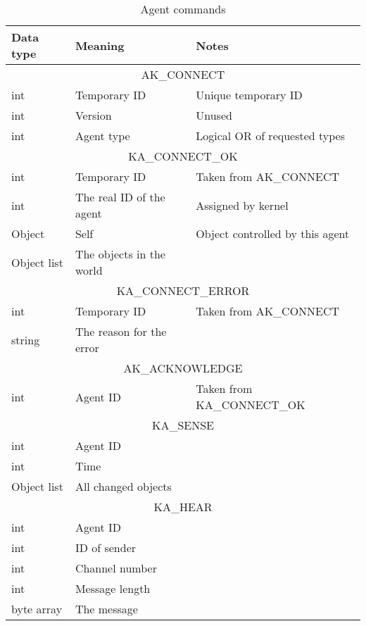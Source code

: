 \begin{table}[p]
\center
\begin{tabular}{|lll|}
\hline
Data type & Meaning & Notes\\
\hline
\hline
\multicolumn{3}{|c|}{AK\_CONNECT}\\
int & Temporary ID & Unique temporary ID\\
int & Version & Unused\\
int & Agent type & Logical OR of requested types\\
\hline
\hline
\multicolumn{3}{|c|}{KA\_CONNECT\_OK}\\
int & Temporary ID & Taken from AK\_CONNECT\\
int & The real ID of the agent & Assigned by kernel\\
Object & Self & Object controlled by this agent\\
Object list & The objects in the world & \\
\hline
\hline
\multicolumn{3}{|c|}{KA\_CONNECT\_ERROR}\\
int & Temporary ID & Taken from AK\_CONNECT\\
string & The reason for the error & \\
\hline
\hline
\multicolumn{3}{|c|}{AK\_ACKNOWLEDGE}\\
int & Agent ID & Taken from KA\_CONNECT\_OK \\
\hline
\hline
\multicolumn{3}{|c|}{KA\_SENSE}\\
int & Agent ID & \\
int & Time & \\
Object list & All changed objects & \\
\hline
\hline
\multicolumn{3}{|c|}{KA\_HEAR}\\
int & Agent ID & \\
int & ID of sender & \\
int & Channel number & \\
int & Message length & \\
byte array & The message & \\
\hline
\end{tabular}
\caption{Agent commands}
\label{table_agent_commands}
\end{table}

